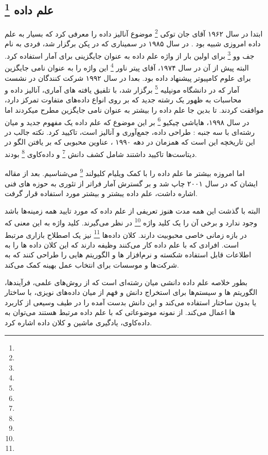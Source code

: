 \documentclass[a4paper, 12pt]{article}
\begin{document}
\subsection*{
	علم داده
	\footnote{}
}
ابتدا در سال ۱۹۶۲ آقای جان توکی
\footnote{}
موضوع آنالیز داده را معرفی کرد که بسیار به علم داده امروزی شبیه بود . در سال ۱۹۸۵ در سمیناری که در پکن برگزار شد، فردی به نام جف وو 
\footnote{}
برای اولین بار از واژه علم داده به عنوان جایگزینی برای آمار استفاده کرد. البته پیش از آن در سال ۱۹۷۴، 
آقای پیتر ناور
\footnote{}
این واژه را به عنوان نامی جایگزین برای علوم کامپیوتر پیشنهاد داده بود.
 بعدا در سال ۱۹۹۲ شرکت کنندگان در نشست آمار که در دانشگاه مونپلیه 
\footnote{}
برگزار شد، با تلفیق یافته های آماری، آنالیز داده و محاسبات به ظهور یک رشته جدید که بر روی انواع داده‌های متفاوت تمرکز دارد، موافقت کردند. 
تا بدین جا علم داده را بیشتر به عنوان نامی جایگزین مطرح میکردند اما در سال ۱۹۹۸، هایاشی چیکیو
\footnote{} 
بر این موضوع که علم داده یک مفهوم جدید و میان رشته‌ای با سه جنبه : طراحی داده، جمع‌آوری و آنالیز است، تاکیید کرد.
نکته جالب در این تاریخچه این است که همزمان در دهه ۱۹۹۰ ، عناوین محبوبی که بر یافتن الگو در دیتاست‌ها تاکیید داشتند شامل کشف دانش 
\footnote{}
و داده‌کاوی
\footnote{}
بودند.


اما امروزه بیشتر ما علم داده را با کمک ویلیام کلیولند 
\footnote{}
می‌شناسیم. بعد از مقاله ایشان که در سال ۲۰۰۱ چاپ شد و بر گسترش آمار فراتر از تئوری به حوزه های فنی اشاره داشت، علم داده یبشتر و بیشتر مورد استفاده قرار گرفت. 

البته با گذشت این همه مدت هنوز تعریفی از علم داده که مورد تایید همه زمینه‌ها باشد وجود ندارد و برخی آن‌ را یک کلید واژه
\footnote{}
 در نظر می‌گیرند. 
 کلید واژه به این معنی که در بازه زمانی خاصی محبوبیت دارند. 
 کلان داده‌ها 
 \footnote{}
 نیز یک اصطلاح بازاری مرتبط است. افرادی که با علم داده کار می‌کنند وظیفه دارند که این کلان داده ها را به اطلاعات قابل استفاده شکسته و نرم‌افزار ها و الگوریتم هایی را طراحی کنند که به شرکت‌ها و موسسات برای انتخاب عمل بهینه کمک می‌کند. 
 
 بطور خلاصه علم داده دانشی میان رشته‌ای است که از روش‌های علمی، فرآیند‌ها، الگوریتم ها و سیستم‌ها برای استخراج دانش و فهم از میان داده‌های نویزی، با ساختار یا بدون ساختار  استفاده می‌کند و این دانش بدست آمده را در طیف وسیعی از کاربرد ها اعمال می‌کند. از نمونه موضوعاتی که با علم داده مرتبط هستند می‌توان به داده‌کاوی، یادگیری ماشین و کلان داده اشاره کرد. 
 
\end{document}
